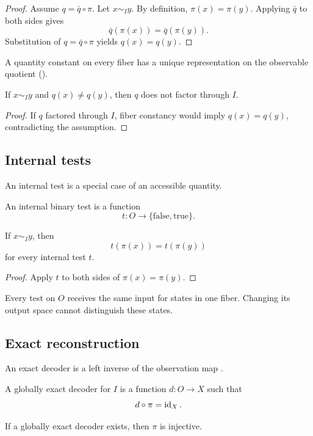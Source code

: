 \begin{proof}
Assume \(q=\bar q\circ\pi\). Let \(x\sim_I y\). By definition, \(\pi(x)=\pi(y)\). Applying \(\bar q\) to both sides gives
\[
\bar q(\pi(x))=\bar q(\pi(y)).
\]
Substitution of \(q=\bar q\circ\pi\) yields \(q(x)=q(y)\).
\end{proof}
A quantity constant on every fiber has a unique representation on the observable quotient ().

\begin{corollary}
If \(x\sim_I y\) and \(q(x)\neq q(y)\), then \(q\) does not factor through \(I\).
\end{corollary}

\begin{proof}
If \(q\) factored through \(I\), fiber constancy would imply \(q(x)=q(y)\), contradicting the assumption.
\end{proof}
\subsection{Internal tests}

An internal test is a special case of an accessible quantity.

\begin{definition}
An internal binary test is a function
\[
t:O\to\{\mathrm{false},\mathrm{true}\}.
\]
\end{definition}
\begin{proposition}
If \(x\sim_I y\), then
\[
t(\pi(x))=t(\pi(y))
\]
for every internal test \(t\).
\end{proposition}

\begin{proof}
Apply \(t\) to both sides of \(\pi(x)=\pi(y)\).
\end{proof}
Every test on \(O\) receives the same input for states in one fiber. Changing its output space cannot distinguish these states.

\subsection{Exact reconstruction}

An exact decoder is a left inverse of the observation map \parencite[Chs. 10--11]{Halmos1974}.

\begin{definition}
A globally exact decoder for \(I\) is a function \(d:O\to X\) such that
\[
d\circ\pi=\operatorname{id}_X.
\]
\end{definition}
\begin{theorem}
If a globally exact decoder exists, then \(\pi\) is injective.
\label{thm:decoderinjective}
\end{theorem}

